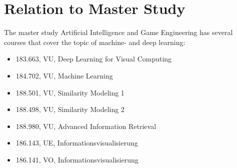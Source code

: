 \documentclass[draft,final,oneside]{vutinfth} %
\begin{document}
\chapter{Relation to Master Study}
The master study Artificial Intelligence and Game Engineering has several courses that cover the topic of machine- and deep learning:

\begin{itemize}
\item 183.663, VU, Deep  Learning  for  Visual  Computing
\item 184.702, VU, Machine Learning
\item 188.501, VU, Similarity Modeling 1
\item 188.498, VU, Similarity Modeling 2
\item 188.980, VU, Advanced Information Retrieval
\item 186.143, UE, Informationsvisualisierung 
\item 186.141, VO, Informationsvisualisierung 
\end{itemize}



\backmatter








\end{document}
